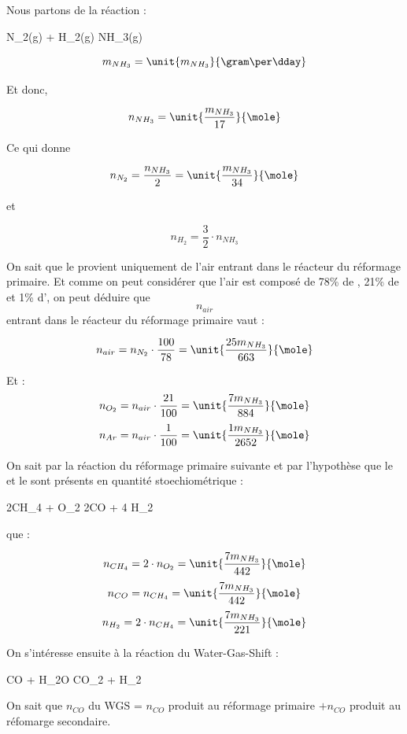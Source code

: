 \documentclass{article}
\begin{document}
Nous partons de la réaction : 
\begin{chemmath}
		N_2(g) + H_2(g) \longrightarrow NH_3(g) 
\end{chemmath}
 	
$$m_{NH_3} = \unit{m_{NH_3}}{\gram\per\dday}$$ 

Et donc, 
 
$$n_{NH_3} = \unit{\frac{m_{NH_3}}{17}}{\mole}$$

Ce qui donne 

$$n_{N_2} = \frac{n_{NH_3}}{2} = \unit{\frac{m_{NH_3}}{34}}{\mole}$$ 

et 

$$n_{H_2} = \frac{3}{2} \cdot n_{NH_3}$$

On sait que le  provient uniquement de l'air entrant 
dans le réacteur du  réformage primaire. Et comme on peut considérer
que l'air est composé de 78\% de , 21\% de 
et 1\% d', on peut déduire que $$n_{air}$$ entrant dans le 
réacteur du réformage primaire vaut : 

$$n_{air}= n_{N_2} \cdot \frac{100}{78} = \unit{\frac{25m_{NH_3}}{663}}{\mole}$$ 

Et :
$$n_{O_2}= n_{air} \cdot \frac{21}{100} = \unit{\frac{7m_{NH_3}}{884}}{\mole}$$
$$n_{Ar}= n_{air} \cdot \frac{1}{100} = \unit{\frac{1m_{NH_3}}{2652}}{\mole}$$

On sait par la réaction du réformage primaire suivante et par l'hypothèse que le
 et le  sont présents en quantité stoechiométrique : 

\begin{chemmath}
	2CH_4 + O_2 \Longrightarrow 2CO + 4 H_2
\end{chemmath} 

que :

$$n_{CH_4} = 2 \cdot n_{O_2} = \unit{\frac{7m_{NH_3}}{442}}{\mole}$$
$$n_{CO} = n_{CH_4} =  \unit{\frac{7m_{NH_3}}{442}} {\mole}$$
$$n_{H_2} = 2 \cdot n_{CH_4} =  \unit{\frac{7m_{NH_3}}{221}}{\mole}$$

On s'intéresse ensuite à la réaction du Water-Gas-Shift : 

\begin{chemmath}
	CO + H_2O \Longrightarrow CO_2 + H_2
\end{chemmath} 

On sait que $n_{CO}$ du WGS = $n_{CO}$ produit au réformage primaire
$+ n_{CO}$ produit au réfomarge secondaire. 
\end{document}
